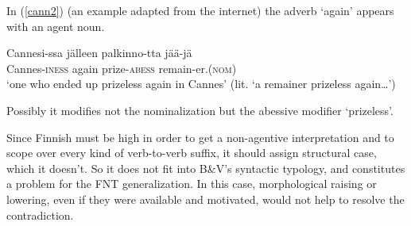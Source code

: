 \documentclass[output=paper,
modfonts
]{LSP/langsci}
\newcommand{\rf}[1]{(\ref{#1})}
\begin{document}
\begin{exe}
\ex\label{particle}
\begin{xlist}



\end{xlist}
 \end{exe} 
 In \rf{cann2} (an example adapted from the internet) the adverb
 `again' appears with an agent noun.
\begin{exe}
\ex\label{cann2} 
 \gll Cannesi-ssa jälleen palkinno-tta jää-jä \\
    Cannes-\textsc{iness}  again prize-\textsc{abess} remain-er.(\textsc{nom})\\
    \glt `one who ended up prizeless again in Cannes' (lit. `a remainer prizeless again…')
\end{exe}
Possibly it modifies not the nominalization but the abessive modifier 
`prizeless'.

Since Finnish  must be high in order to get a non-agentive interpretation and to
scope over every kind of verb-to-verb suffix, it should assign structural case, which it
doesn't.  So it does not fit into B\&V's syntactic typology, and constitutes a problem for the
FNT generalization.  In this case, morphological raising or lowering, even if they were
available and motivated, would not help to resolve the contradiction.
\end{document}
